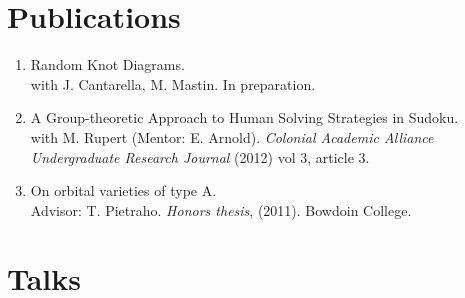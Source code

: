 \documentclass[letterpaper]{article}
\begin{document}
\section*{Publications}

\begin{enumerate}
\item Random Knot Diagrams.\\
with J. Cantarella, M. Mastin. In preparation.
\item A Group-theoretic Approach to Human Solving Strategies in
  Sudoku.\\
with M. Rupert (Mentor: E. Arnold). \textit{Colonial Academic Alliance
  Undergraduate Research Journal} (2012) vol 3, article 3.
\item On orbital varieties of type A. \\
Advisor: T. Pietraho. \textit{Honors thesis}, (2011). Bowdoin College.
\end{enumerate}

\section*{Talks}
\end{document}
